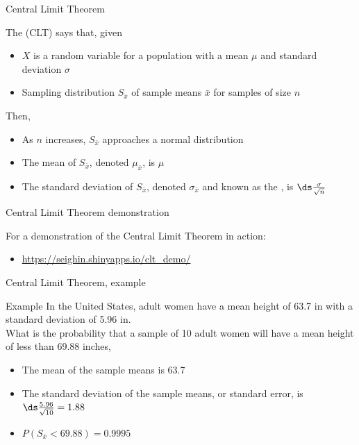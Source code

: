 \documentclass[xcolor=table, handout]{beamer}
\begin{document}
\begin{frame}{Central Limit Theorem}
\begin{block}{}
\large
The  (CLT) says that, given
\begin{itemize}
\pause\item $X$ is a random variable for a population with a mean $\mu$ and standard deviation $\sigma$
\pause\item Sampling distribution $S_{\bar x}$ of sample means $\bar x$ for samples of size $n$
\end{itemize}
\pause Then,
\begin{itemize}
\item As $n$ increases, $S_{\bar x}$ approaches a normal distribution
\pause\item The mean of $S_{\bar x}$, denoted $\mu_{\bar x}$, is $\mu$
\pause\item The standard deviation of $S_{\bar x}$, denoted $\sigma_{\bar x}$ and known as the , is $\ds \frac \sigma {\sqrt n}$  
\end{itemize}
\end{block}
\end{frame}

\begin{frame}{Central Limit Theorem demonstration}
\begin{block}{}
\large
For a demonstration of the Central Limit Theorem in action:
\begin{itemize}
\item \url{https://seighin.shinyapps.io/clt_demo/}
\end{itemize}
\end{block}
\end{frame}

\begin{frame}{Central Limit Theorem, example}
\begin{exampleblock}{Example}
\large
In the United States, adult women have a mean height of 63.7 in with a standard deviation of 5.96 in. \\
\medskip
What is the probability that a sample of 10 adult women will have a mean height of less than 69.88 inches,
\begin{itemize}
\pause\item The mean of the sample means is 63.7
\pause\item The standard deviation of the sample means, or standard error, is $\ds \frac {5.96}{\sqrt{10}} = 1.88$  
\pause\item $P(S_{\bar x} < 69.88) = 0.9995$
\end{itemize}
\end{exampleblock}

\end{frame}
\end{document}
